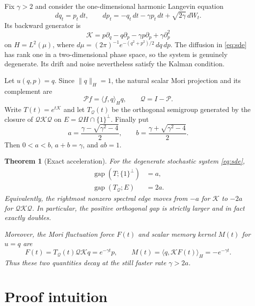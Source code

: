 \documentclass[11pt]{article}
\newtheorem{theorem}{Theorem}
\theoremstyle{remark}
\newcommand{\K}{\mathcal K}
\newcommand{\Pj}{\mathcal P}
\newcommand{\Qj}{\mathcal Q}
\begin{document}
Fix $\gamma>2$ and consider the one-dimensional harmonic Langevin equation
\begin{equation}\label{eq:sde}
 dq_t=p_t\,dt,\qquad
 dp_t=-q_t\,dt-\gamma p_t\,dt+\sqrt{2\gamma}\,dW_t.
\end{equation}
Its backward generator is
\begin{equation}\label{eq:generator}
 \K=p\partial_q-q\partial_p-\gamma p\partial_p
       +\gamma\partial_p^2
\end{equation}
on $H=L^2(\mu)$, where
$d\mu=(2\pi)^{-1}e^{-(q^2+p^2)/2}\,dq\,dp$.  The diffusion in
\eqref{eq:sde} has rank one in a two-dimensional phase space, so the system
is genuinely degenerate.  Its drift and noise nevertheless satisfy the
Kalman condition.

Let $u(q,p)=q$.  Since $\|q\|_H=1$, the natural scalar Mori projection and
its complement are
\[
 \Pj f=\langle f,q\rangle_H q,\qquad \Qj=I-\Pj.
\]
Write $T(t)=e^{t\K}$ and let $T_{\Qj}(t)$ be the orthogonal semigroup generated
by the closure of $\Qj\K\Qj$ on
$E=\Qj H\cap\{1\}^{\perp}$.  Finally put
\begin{equation}\label{eq:ab}
 a=\frac{\gamma-\sqrt{\gamma^2-4}}2,
 \qquad
 b=\frac{\gamma+\sqrt{\gamma^2-4}}2.
\end{equation}
Then $0<a<b$, $a+b=\gamma$, and $ab=1$.

\begin{theorem}[Exact acceleration]\label{thm:main}
For the degenerate stochastic system \eqref{eq:sde},
\begin{align*}
 \operatorname{gap}(T;\{1\}^{\perp})&=a,\\
 \operatorname{gap}(T_{\Qj};E)&=2a.
\end{align*}
Equivalently, the rightmost nonzero spectral edge moves from $-a$ for
$\K$ to $-2a$ for $\Qj\K\Qj$.  In particular, the positive orthogonal gap is
strictly larger and in fact exactly doubles.

Moreover, the Mori fluctuation force $F(t)$ and scalar memory kernel $M(t)$
for $u=q$ are
\begin{equation}\label{eq:force-memory}
 F(t)=T_{\Qj}(t)\Qj\K q=e^{-\gamma t}p,
 \qquad
 M(t)=\langle q,\K F(t)\rangle_H=-e^{-\gamma t}.
\end{equation}
Thus these two quantities decay at the still faster rate $\gamma>2a$.
\end{theorem}

\section{Proof intuition}
\end{document}
